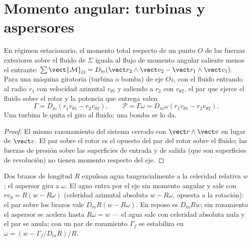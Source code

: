 \section{Momento angular: turbinas y aspersores}

\begin{theorem}\label{thm:b2:flow-balances:angular}
En régimen estacionario, el momento total respecto de un punto $O$ de las
fuerzas exteriores sobre el fluido de $\Sigma$ iguala al flujo de momento
angular saliente menos el entrante: $\sum\vect{\mathcal M}_O = D_m(\vect r_2\wedge\vect v_2 - \vect r_1
\wedge\vect v_1)$. Para una máquina giratoria (turbina o bomba) de eje $Oz$,
con el fluido entrando al radio $r_1$ con velocidad azimutal
$v_{\theta1}$ y saliendo a $r_2$ con $v_{\theta2}$, el par que ejerce el
fluido sobre el rotor y la potencia que entrega valen
\[
\Gamma = D_m(r_1v_{\theta1} - r_2v_{\theta2}) , \qquad
\mathcal P = \Gamma\omega = D_m\omega(r_1v_{\theta1} - r_2v_{\theta2}) .
\]
Una turbina le quita el giro al fluido; una bomba se lo da.
\end{theorem}

\begin{proof}
El mismo razonamiento del sistema cerrado con $\vect r\wedge\vect v$ en
lugar de $\vect v$. El par sobre el rotor es el opuesto del par del rotor
sobre el fluido; las fuerzas de presión sobre las superficies de entrada y
de salida (que son superficies de revolución) no tienen momento respecto
del eje.
\end{proof}

\begin{example}\label{ex:b2:flow-balances:sprinkler}
Dos brazos de longitud $R$ expulsan agua tangencialmente a la celeridad
relativa $w$; el aspersor gira a $\omega$. El agua entra por el eje sin
momento angular y sale con $r v_\theta = R(w - R\omega)$ (celeridad
azimutal absoluta $w - R\omega$, opuesta a la rotación): el par sobre los
brazos vale $D_mR(w - R\omega)$. En reposo es $D_mRw$; sin rozamiento el
aspersor se acelera hasta $R\omega = w$ --- el agua sale con celeridad
absoluta nula y el par se anula; con un par de rozamiento
$\Gamma_f$ se estabiliza en $\omega = (w - \Gamma_f/D_mR)/R$.
\end{example}

